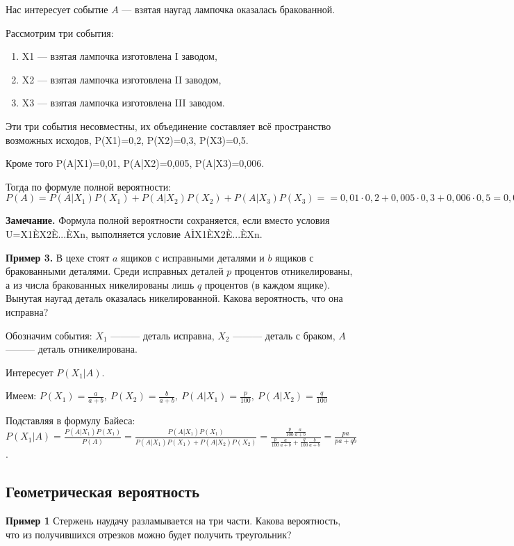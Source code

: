 \documentclass{article}
\begin{document}
Нас интересует событие $A$ — взятая наугад лампочка оказалась бракованной.

Рассмотрим три события: \begin{enumerate}
    \item X1 — взятая лампочка изготовлена I заводом,
    \item X2 — взятая лампочка изготовлена II заводом,
    \item X3 — взятая лампочка изготовлена III заводом.
\end{enumerate}

Эти три события несовместны, их объединение составляет всё пространство
возможных исходов, P(X1)=0,2, P(X2)=0,3, P(X3)=0,5.

Кроме того P(A|X1)=0,01, P(A|X2)=0,005, P(A|X3)=0,006.

Тогда по формуле полной вероятности: \(P(A)=P(A|X_1)P(X_1)+P(A|X_2)P(X_2)+P(A|X_3)P(X_3)= =0,01 \cdot 0,2 + 0,005 \cdot 0,3 + 0,006 \cdot 0,5 = 0,002 + 0,0015 + 0,003 = 0,0065.\)

\textbf{Замечание.} Формула полной вероятности сохраняется, если вместо условия U=X1ÈX2È...ÈXn, выполняется условие AÌX1ÈX2È...ÈXn.


\textbf{Пример 3.} В цехе стоят $a$ ящиков с исправными деталями и $b$ ящиков с бракованными деталями. Среди исправных деталей $p$ процентов отникелированы, а из числа бракованных никелированы лишь $q$ процентов (в каждом ящике). Вынутая наугад деталь оказалась никелированной. Какова вероятность, что она исправна?

Обозначим события: $X_1$ ——— деталь исправна, $X_2$ ——— деталь с браком, $A$ ——— деталь отникелирована.

Интересует \(P(X_1|A)\).

Имеем: \( P(X_1) = \frac{a}{a + b}, \ P(X_2) = \frac{b}{a + b},  \ P(A|X_1) = \frac{p}{100},  \ P(A|X_2) = \frac{q}{100}\)

Подставляя в формулу Байеса: \( P(X_1|A) = \frac{P(A|X_1)P(X_1)}{P(A)} = \frac{P(A|X_1)P(X_1)}{P(A|X_1)P(X_1)+P(A|X_2)P(X_2)} = \frac{ \frac{p}{100} \frac{a}{a + b} }{ \frac{p}{100} \frac{a}{a + b} + \frac{q}{100} \frac{b}{a + b}} = \frac{pa}{pa + qb}\).




\subsection{Геометрическая вероятность}
\textbf{Пример 1}  Стержень наудачу разламывается на три части. Какова вероятность, что из получившихся отрезков можно будет получить треугольник?
\end{document}
